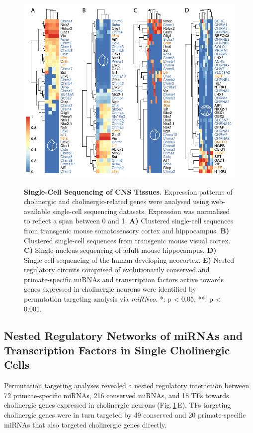 \begin{figure}[ht]
\centering
\includegraphics[height=10cm]{figures/singlecell}
\caption[Single-Cell Sequencing of CNS Tissues.]{\textbf{Single-Cell Sequencing of CNS Tissues.} Expression patterns of cholinergic and cholinergic-related genes were analysed using web-available single-cell sequencing datasets. Expression was normalised to reflect a span between 0 and 1. \textbf{A)} Clustered single-cell sequences from transgenic mouse somatosensory cortex and hippocampus.\cite{Zeisel2015} \textbf{B)} Clustered single-cell sequences from transgenic mouse visual cortex.\cite{Tasic2016} \textbf{C)} Single-nucleus sequencing of adult mouse hippocampus.\cite{Habib2016} \textbf{D)} Single-cell sequencing of the human developing neocortex.\cite{Darmanis2015} \textbf{E)} Nested regulatory circuits comprised of evolutionarily conserved and primate-specific miRNAs and transcription factors active towards genes expressed in cholinergic neurons were identified by permutation targeting analysis via \emph{miRNeo}. *: p < 0.05, **: p < 0.001.
\label{fig:singlecell}}
\end{figure}

\subsection{Nested Regulatory Networks of miRNAs and Transcription Factors in Single Cholinergic Cells}
Permutation targeting analyses revealed a nested regulatory interaction between 72 primate-specific miRNAs, 216 conserved miRNAs, and 18 TFs towards cholinergic genes expressed in cholinergic neurons (Fig.\,\ref{fig:singlecell}\,E). TFs targeting cholinergic genes were in turn targeted by 49 conserved and 20 primate-specific miRNAs that also targeted cholinergic genes directly.

